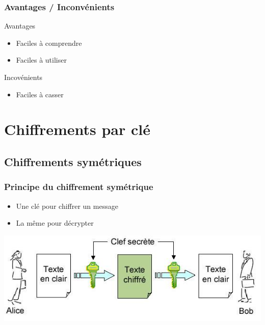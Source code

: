 \documentclass[xcolor={dvipsnames}]{beamer}
\begin{document}
\begin{frame}
\frametitle{Avantages / Inconvénients}

\begin{exampleblock}{Avantages}
	\begin{itemize}
		\item Faciles à comprendre
		\item Faciles à utiliser
	\end{itemize}
\end{exampleblock}

\begin{alertblock}{Incovénients}
	\begin{itemize}
		\item Faciles à casser
	\end{itemize}
\end{alertblock}
\end{frame}
\section{Chiffrements par clé}

\subsection{Chiffrements symétriques}

\begin{frame}
\frametitle{Principe du chiffrement symétrique}

\begin{itemize}
	\item Une clé pour chiffrer un message
	\item La même pour décrypter
\end{itemize}

\begin{center}
	\includegraphics[scale=0.5]{sym}
\end{center}
\end{frame}
\end{document}
